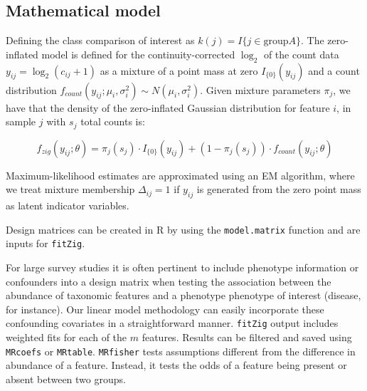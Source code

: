 \documentclass[a4paper,12pt]{article}
\begin{document}
\subsection{Mathematical model}

Defining the class comparison of interest as $k(j)=I\{j \in \mathrm{ group } A\}$. The zero-inflated model is defined for the continuity-corrected $\log_2$ of the count data $y_{ij} = \log_2(c_{ij}+1)$ as a mixture of a point mass at zero $I_{\{0\}}(y_{ij})$ and a count distribution $f_{count}(y_{ij};\mu_i, \sigma_i^2) \sim N(\mu_i, \sigma_i^2)$.
Given mixture parameters $\pi_{j}$, we have that the density of the zero-inflated Gaussian distribution for feature $i$, in sample $j$ with $s_{j}$ total counts is:

\begin{equation}
f_{zig}(y_{ij}; \theta ) = \pi_{j}(s_{j}) \cdot I_{\{0\}}(y_{ij})
+ (1-\pi_{j}(s_{j})) \cdot f_{count}(y_{ij};\theta)
\end{equation}

Maximum-likelihood estimates are approximated using an EM algorithm,
where we treat mixture membership $\Delta_{ij}=1$ if $y_{ij}$ is
generated from the zero point mass as latent indicator variables\cite{EM}.

Design matrices can be created in R by using the \texttt{model.matrix} function and are inputs for \texttt{fitZig}.

For large survey studies it is often pertinent to include phenotype information or confounders into a design matrix when testing the association between the abundance of taxonomic features and a phenotype phenotype of interest (disease, for
instance). Our linear model methodology can easily incorporate these
confounding covariates in a straightforward manner. \texttt{fitZig} output includes weighted fits for each of the $m$ features. Results can be filtered and saved using \texttt{MRcoefs} or \texttt{MRtable}. \texttt{MRfisher} tests assumptions different from the difference in abundance of a feature. Instead, it tests the odds of a feature being present or absent between two groups. 
\end{document}
